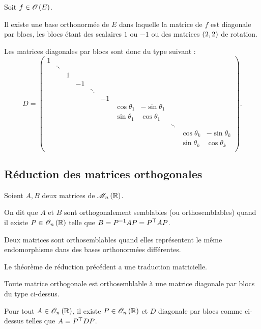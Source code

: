 \begin{theo}
Soit \(f\in\Orth{}[E]\).

Il existe une base orthonormée de \(E\) dans laquelle la matrice de \(f\) est diagonale par blocs, les blocs étant des scalaires \(1\) ou \(-1\) ou des matrices \(\left(2,2\right)\) de rotation.
\end{theo}

Les matrices diagonales par blocs sont donc du type suivant : \[D=\begin{pmatrix}
1 &  &  &  &  &  &  &  &  &  &  \\
& \ddots &  &  &  &  &  &  &  &  &  \\
&  & 1 &  &  &  &  &  &  &  &  \\
&  &  & -1 &  &  &  &  &  &  &  \\
&  &  &  & \ddots &  &  &  &  &  &  \\
&  &  &  &  & -1 &  &  &  &  &  \\
&  &  &  &  &  & \cos\theta_1 & -\sin\theta_1 &  &  &  \\
&  &  &  &  &  & \sin\theta_1 & \cos\theta_1 &  &  &  \\
&  &  &  &  &  &  &  & \ddots &  &  \\
&  &  &  &  &  &  &  &  & \cos\theta_k & -\sin\theta_k \\
&  &  &  &  &  &  &  &  & \sin\theta_k & \cos\theta_k \\
\end{pmatrix}.\]

\subsection{Réduction des matrices orthogonales}

\begin{defi}
Soient \(A,B\) deux matrices de \(\M{n}[\R]\).

On dit que \(A\) et \(B\) sont orthogonalement semblables (ou orthosemblables) quand il existe \(P\in\Orth{n}[\R]\) telle que \(B=P^{-1} AP=P^{\top}AP\).
\end{defi}

Deux matrices sont orthosemblables quand elles représentent le même endomorphisme dans des bases orthonormées différentes.

Le théorème de réduction précédent a une traduction matricielle.

\begin{theo}
Toute matrice orthogonale est orthosemblable à une matrice diagonale par blocs du type ci-dessus.

Pour tout \(A\in\Orth{n}[\R]\), il existe \(P\in\Orth{n}[\R]\) et \(D\) diagonale par blocs comme ci-dessus telles que \(A=P^{\top}DP\).
\end{theo}

